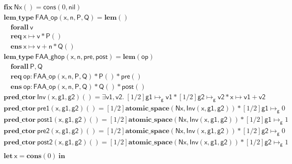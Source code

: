 \documentclass{article}
\newcommand{\gmapsto}{\mapsto_\mathsf{g}}
\begin{document}
\begin{figure}
$$\begin{array}{l}
\mathbf{fix}\ \mathsf{Nx}() = \mathsf{cons}(0, \mathsf{nil})\\
\mathbf{lem\_type}\ \mathsf{FAA\_op}(\mathsf{x}, \mathsf{n}, \mathsf{P}, \mathsf{Q}) = \mathbf{lem}()\\
\quad \mathbf{forall}\ \mathsf{v}\\
\quad \mathbf{req}\ \mathsf{x} \mapsto \mathsf{v} * \mathsf{P}()\\
\quad \mathbf{ens}\ \mathsf{x} \mapsto \mathsf{v} + \mathsf{n} * \mathsf{Q}()\\
\mathbf{lem\_type}\ \mathsf{FAA\_ghop}(\mathsf{x}, \mathsf{n}, \mathsf{pre}, \mathsf{post}) = \mathbf{lem}(\mathsf{op})\\
\quad \mathbf{forall}\ \mathsf{P}, \mathsf{Q}\\
\quad \mathbf{req}\ \mathsf{op} : \mathsf{FAA\_op}(\mathsf{x}, \mathsf{n}, \mathsf{P}, \mathsf{Q}) * \mathsf{P}() * \mathsf{pre}()\\
\quad \mathbf{ens}\ \mathsf{op} : \mathsf{FAA\_op}(\mathsf{x}, \mathsf{n}, \mathsf{P}, \mathsf{Q}) * \mathsf{Q}() * \mathsf{post}()\\
\mathbf{pred\_ctor}\ \mathsf{Inv}(\mathsf{x}, \mathsf{g1}, \mathsf{g2})() = \exists \mathsf{v1}, \mathsf{v2}.\;[1/2]\mathsf{g1} \gmapsto \mathsf{v1} * [1/2]\mathsf{g2} \gmapsto \mathsf{v2} * \mathsf{x} \mapsto \mathsf{v1} + \mathsf{v2}\\
\mathbf{pred\_ctor}\ \mathsf{pre1}(\mathsf{x}, \mathsf{g1}, \mathsf{g2})() = [1/2]\mathbf{atomic\_space}(\mathsf{Nx}, \mathsf{Inv}(\mathsf{x}, \mathsf{g1}, \mathsf{g2})) * [1/2]\mathsf{g1} \gmapsto 0\\
\mathbf{pred\_ctor}\ \mathsf{post1}(\mathsf{x}, \mathsf{g1}, \mathsf{g2})() = [1/2]\mathbf{atomic\_space}(\mathsf{Nx}, \mathsf{Inv}(\mathsf{x}, \mathsf{g1}, \mathsf{g2})) * [1/2]\mathsf{g1} \gmapsto 1\\
\mathbf{pred\_ctor}\ \mathsf{pre2}(\mathsf{x}, \mathsf{g1}, \mathsf{g2})() = [1/2]\mathbf{atomic\_space}(\mathsf{Nx}, \mathsf{Inv}(\mathsf{x}, \mathsf{g1}, \mathsf{g2})) * [1/2]\mathsf{g2} \gmapsto 0\\
\mathbf{pred\_ctor}\ \mathsf{post2}(\mathsf{x}, \mathsf{g1}, \mathsf{g2})() = [1/2]\mathbf{atomic\_space}(\mathsf{Nx}, \mathsf{Inv}(\mathsf{x}, \mathsf{g1}, \mathsf{g2})) * [1/2]\mathsf{g2} \gmapsto 1\\
\\
\mathbf{let}\ \mathsf{x} = \mathbf{cons}(0)\ \mathbf{in}\\

\end{array}$$
\end{figure}
\end{document}

